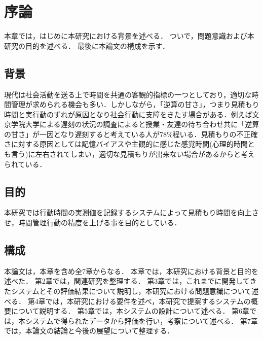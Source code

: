 \chapter{序論}
本章では，はじめに本研究における背景を述べる．
ついで，問題意識および本研究の目的を述べる．
最後に本論文の構成を示す．

\section{背景}
現代は社会活動を送る上で時間を共通の客観的指標の一つとしており，適切な時間管理が求められる機会も多い．しかしながら，「逆算の甘さ」，つまり見積もり時間と実行動のずれが原因となり社会行動に支障をきたす場合がある．例えば文京学院大学による遅刻の状況の調査によると授業・友達の待ち合わせ共に「逆算の甘さ」が一因となり遅刻すると考えている人が78\%程いる\cite{bunkyo}．見積もりの不正確さに対する原因としては記憶バイアスや主観的に感じた感覚時間(心理的時間とも言う)に左右されてしまい，適切な見積もりが出来ない場合があるからと考えられている．

\section{目的}
本研究では行動時間の実測値を記録するシステムによって見積もり時間を向上させ，時間管理行動の精度を上げる事を目的としている．

\section{構成}
本論文は，本章を含め全7章からなる．
本章では，本研究における背景と目的を述べた．
第2章では，関連研究を整理する．
第3章では，これまでに開発してきたシステムとその評価結果について説明し，本研究における問題意識について述べる．
第4章では，本研究における要件を述べ，本研究で提案するシステムの概要について説明する．
第5章では，本システムの設計について述べる．
第6章では，本システムで得られたデータから評価を行い，考察について述べる．
第7章では，本論文の結論と今後の展望について整理する．